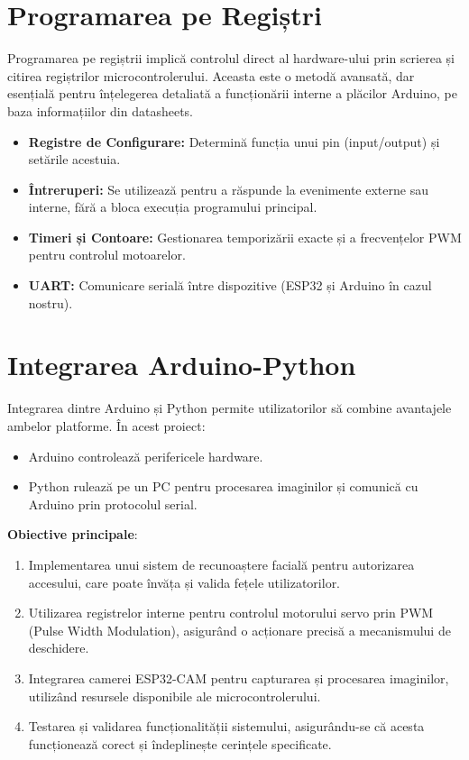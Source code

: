 \documentclass{report}
\begin{document}
\section{Programarea pe Regiștri}
Programarea pe regiștrii implică controlul direct al hardware-ului prin scrierea și citirea regiștrilor microcontrolerului. Aceasta este o metodă avansată, dar esențială pentru înțelegerea detaliată a funcționării interne a plăcilor Arduino, pe baza informațiilor din datasheets.

\begin{itemize}
    \item \textbf{Registre de Configurare:} Determină funcția unui pin (input/output) și setările acestuia.
    \item \textbf{Întreruperi:} Se utilizează pentru a răspunde la evenimente externe sau interne, fără a bloca execuția programului principal.
    \item \textbf{Timeri și Contoare:} Gestionarea temporizării exacte și a frecvențelor PWM pentru controlul motoarelor.
    \item \textbf{UART:} Comunicare serială între dispozitive (ESP32 și Arduino în cazul nostru).
\end{itemize}

\section{Integrarea Arduino-Python}
Integrarea dintre Arduino și Python permite utilizatorilor să combine avantajele ambelor platforme. În acest proiect:
\begin{itemize}
    \item Arduino controlează perifericele hardware.
    \item Python rulează pe un PC pentru procesarea imaginilor și comunică cu Arduino prin protocolul serial.
\end{itemize}

\textbf{Obiective principale}:
\begin{enumerate}
    \item Implementarea unui sistem de recunoaștere facială pentru autorizarea accesului, care poate învăța și valida fețele utilizatorilor.
    \item Utilizarea registrelor interne pentru controlul motorului servo prin PWM (Pulse Width Modulation), asigurând o acționare precisă a mecanismului de deschidere.
    \item Integrarea camerei ESP32-CAM pentru capturarea și procesarea imaginilor, utilizând resursele disponibile ale microcontrolerului.
    \newpage
    \vspace*{1cm}
    \item Testarea și validarea funcționalității sistemului, asigurându-se că acesta funcționează corect și îndeplinește cerințele specificate.
\end{enumerate}
\end{document}
